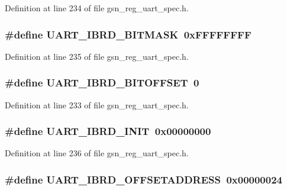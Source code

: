 Definition at line 234 of file gsn\_\-reg\_\-uart\_\-spec.h.

\hypertarget{a00575_a1a31e5a7154f670fd8bd38f15a4dab4e}{
\subsubsection[{UART\_\-IBRD\_\-BITMASK}]{\setlength{\rightskip}{0pt plus 5cm}\#define UART\_\-IBRD\_\-BITMASK~0xFFFFFFFF}}
\label{a00575_a1a31e5a7154f670fd8bd38f15a4dab4e}


Definition at line 235 of file gsn\_\-reg\_\-uart\_\-spec.h.

\hypertarget{a00575_ae7e5bc120726d8ec96f68016a1a63cf9}{
\subsubsection[{UART\_\-IBRD\_\-BITOFFSET}]{\setlength{\rightskip}{0pt plus 5cm}\#define UART\_\-IBRD\_\-BITOFFSET~0}}
\label{a00575_ae7e5bc120726d8ec96f68016a1a63cf9}


Definition at line 233 of file gsn\_\-reg\_\-uart\_\-spec.h.

\hypertarget{a00575_afb17ea23dc1a14bbabae92b61fd0dc40}{
\subsubsection[{UART\_\-IBRD\_\-INIT}]{\setlength{\rightskip}{0pt plus 5cm}\#define UART\_\-IBRD\_\-INIT~0x00000000}}
\label{a00575_afb17ea23dc1a14bbabae92b61fd0dc40}


Definition at line 236 of file gsn\_\-reg\_\-uart\_\-spec.h.

\hypertarget{a00575_ad76a582a387254611af239e438c7e86a}{
\subsubsection[{UART\_\-IBRD\_\-OFFSETADDRESS}]{\setlength{\rightskip}{0pt plus 5cm}\#define UART\_\-IBRD\_\-OFFSETADDRESS~0x00000024}}
\label{a00575_ad76a582a387254611af239e438c7e86a}


